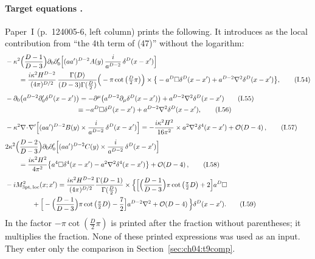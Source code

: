 \paragraph{Target equations \tP.}
Paper~I (p.~124005-6, left column) prints the following.
It introduces  as the local contribution from ``the 4th term of (47)'' without the logarithm:
\begin{align*}
&-\kappa^2\Big(\frac{D-1}{D-3}\Big)\partial_0\partial'_0\Big[(aa')^{D-2}A(y)\,\frac{i}{a^{D-2}}\,\delta^D(x-x')\Big]\\
&\qquad=\frac{i\kappa^2H^{D-2}}{(4\pi)^{D/2}}\,\frac{\Gamma(D)}{(D-3)\Gamma(\frac D2)}\Big(-\pi\cot\big(\tfrac D2\pi\big)\Big)
\times\big\{-a^D\square\delta^D(x-x')+a^{D-2}\nabla^2\delta^D(x-x')\big\},
\tag{I.54}\\[4pt]
&-\partial_0\big(a^{D-2}\partial'_0\delta^D(x-x')\big)=-\partial^\mu\big(a^{D-2}\partial_\mu\delta^D(x-x')\big)+a^{D-2}\nabla^2\delta^D(x-x')
\tag{I.55}\\
&\phantom{-\partial_0\big(a^{D-2}\partial'_0\delta^D(x-x')\big)}\equiv-a^D\square\delta^D(x-x')+a^{D-2}\nabla^2\delta^D(x-x'),
\tag{I.56}\\[4pt]
&-\kappa^2\nabla\!\cdot\!\nabla'\Big[(aa')^{D-2}B(y)\times\frac{i}{a^{D-2}}\,\delta^D(x-x')\Big]
=-\frac{i\kappa^2H^2}{16\pi^2}\times a^2\nabla^2\delta^4(x-x')+\order{D-4},
\tag{I.57}\\[4pt]
&2\kappa^2\Big(\frac{D-2}{D-3}\Big)\partial_0\partial'_0\Big[(aa')^{D-2}C(y)\times\frac{i}{a^{D-2}}\,\delta^D(x-x')\Big]\\
&\qquad=\frac{i\kappa^2H^2}{4\pi^2}\big\{a^4\square\delta^4(x-x')-a^2\nabla^2\delta^4(x-x')\big\}+\order{D-4},
\tag{I.58}\\[4pt]
&-iM^2_{\rm 3pt,\,loc}(x;x')=\frac{i\kappa^2H^{D-2}}{(4\pi)^{D/2}}\frac{\Gamma(D-1)}{\Gamma(\frac D2)}
\times\Big\{\Big[\Big(\frac{D-1}{D-3}\Big)\pi\cot\big(\tfrac\pi2D\big)+2\Big]a^D\square\notag\\
&\qquad\qquad+\Big[-\Big(\frac{D-1}{D-3}\Big)\pi\cot\big(\tfrac\pi2D\big)-\frac72\Big]a^{D-2}\nabla^2+\order{D-4}\Big\}\delta^D(x-x').
\tag{I.59}
\end{align*}
In  the factor $-\pi\cot(\frac D2\pi)$ is printed after the fraction without parentheses; it multiplies the fraction.
None of these printed expressions was used as an input. They enter only the comparison in Section~\ref{sec:ch04:t9comp}.

